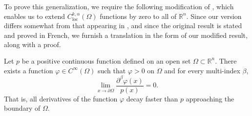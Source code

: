 \documentclass[oneside,hidelinks,indentfirst,10pt]{book}
\begin{document}
To prove this generalization, we require the following modification of \cite[Lemma 2.1]{Bony}, which enables us to extend \(C^{k,\alpha}_{\mathrm{loc}}(\Omega)\) functions by zero to all of \(\mathbb{R}^n\). Since our version differs somewhat from that appearing in \cite{Bony}, and since the original result is stated and proved in French, we furnish a translation in the form of our modified result, along with a proof.


\begin{lem}[Bony]\label{lem:extbyzero}
Let \(p\) be a positive continuous function defined on an open set \(\Omega\subset\mathbb{R}^n\). There exists a function \(\varphi\in C^\infty(\Omega)\) such that \(\varphi>0\) on \(\Omega\) and for every multi-index \(\beta\),
\begin{equation}\label{eq:boundarydecay}
    \lim_{x\rightarrow\partial\Omega}\frac{\partial^\beta \varphi(x)}{p(x)}=0.
\end{equation}
That is, all derivatives of the function \(\varphi\) decay faster than \(p\) approaching the boundary of \(\Omega\).
\end{lem}
\end{document}
